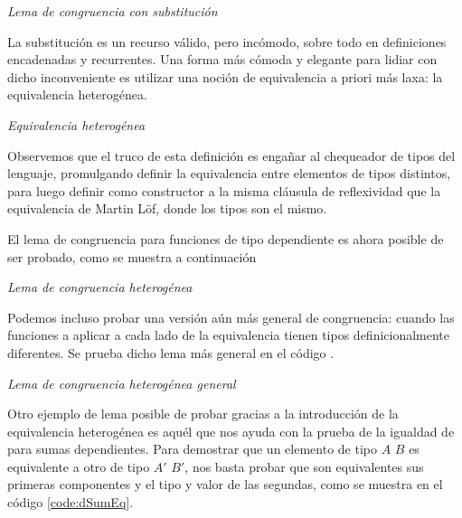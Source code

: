 \begin{agdacode}{\it Lema de congruencia con substitución}\label{code:scong}

\end{agdacode}

La substitución es un recurso válido, pero incómodo, sobre todo en definiciones encadenadas y recurrentes.
Una forma más cómoda y elegante para lidiar con dicho inconveniente es utilizar una noción de equivalencia a priori más laxa: la equivalencia heterogénea\cite{mcbride:motive}.

\begin{agdacode}{\it Equivalencia heterogénea} \label{code:heterequiv}

\end{agdacode}

Observemos que el truco de esta definición es engañar al chequeador de tipos del lenguaje, promulgando definir la equivalencia entre elementos de tipos distintos, para luego definir como constructor a la misma cláusula de reflexividad que la equivalencia de Martin Löf, donde los tipos son el mismo.

El lema de congruencia para funciones de tipo dependiente es ahora posible de ser probado, como se muestra a continuación

\begin{agdacode}{\it Lema de congruencia heterogénea}

\end{agdacode}

Podemos incluso probar una versión aún más general de congruencia: cuando las funciones a aplicar a cada lado de la equivalencia tienen tipos definicionalmente diferentes. Se prueba dicho lema más general en el código . 

\begin{agdacode}\label{code:dcong}{\it Lema de congruencia heterogénea general}
  
\end{agdacode}

Otro ejemplo de lema posible de probar gracias a la introducción de la equivalencia heterogénea es aquél que nos ayuda con la prueba de la igualdad de para sumas dependientes. Para demostrar que un elemento de tipo \AgdaDatatype{$\Sigma$} $A$ $B$ es equivalente a otro de tipo \AgdaDatatype{$\Sigma$} $A'$ $B'$, nos basta probar que son equivalentes sus primeras componentes y el tipo y valor de las segundas, como se muestra en el código \ref{code:dSumEq}.

